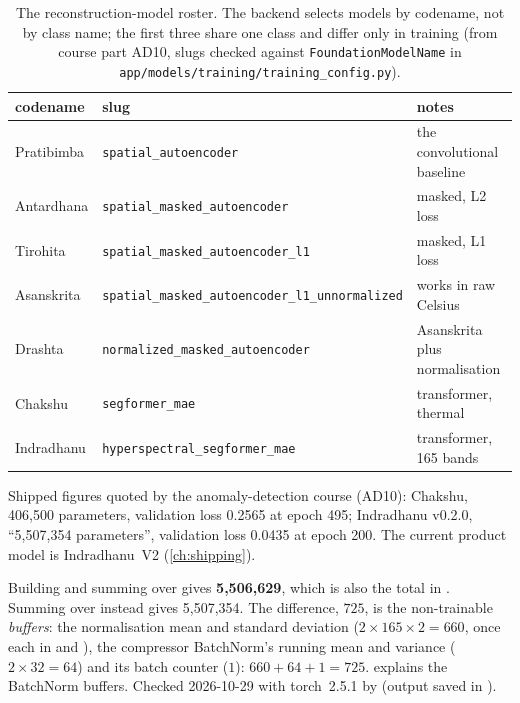 \begin{table}[htbp]\centering\small
\caption{The reconstruction-model roster. The backend selects models by codename, not by class name;
the first three share one class and differ only in training (from course part AD10,
slugs checked against \texttt{FoundationModelName} in \texttt{app/models/training/training\_config.py}).}
\label{tab:recon:roster}
\begin{tabular}{lll}
\toprule
codename & slug & notes\\
\midrule
Pratibimba & \texttt{spatial\_autoencoder} & the convolutional baseline\\
Antardhana & \texttt{spatial\_masked\_autoencoder} & masked, L2 loss\\
Tirohita & \texttt{spatial\_masked\_autoencoder\_l1} & masked, L1 loss\\
Asanskrita & \texttt{spatial\_masked\_autoencoder\_l1\_unnormalized} & works in raw Celsius\\
Drashta & \texttt{normalized\_masked\_autoencoder} & Asanskrita plus normalisation\\
Chakshu & \texttt{segformer\_mae} & transformer, thermal\\
Indradhanu & \texttt{hyperspectral\_segformer\_mae} & transformer, 165 bands\\
\bottomrule
\end{tabular}
\end{table}

\begin{drift}
Shipped figures quoted by the anomaly-detection course (AD10): Chakshu, 406{,}500 parameters,
validation loss 0.2565 at epoch 495;
Indradhanu v0.2.0, ``5{,}507{,}354 parameters'', validation loss 0.0435 at epoch
200. The current product model is Indradhanu~V2 (\cref{ch:shipping}).
\end{drift}

\begin{sourcenote}
Building  and summing
 over  gives \textbf{5{,}506{,}629}\tagC, which is also the
 total in . Summing over
 instead gives 5{,}507{,}354\tagC. The difference, $725$, is the non-trainable
\emph{buffers}: the normalisation mean and standard deviation ($2\times165\times2=660$, once each in
 and ), the compressor BatchNorm's running mean and
variance ($2\times32=64$) and its batch counter ($1$): $660+64+1=725$.  explains
the BatchNorm buffers. Checked 2026-10-29 with torch~2.5.1 by  (output saved in
).
\end{sourcenote}

